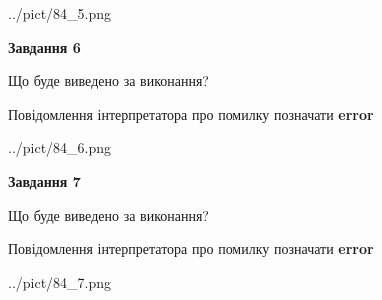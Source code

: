 \documentclass[10pt, ukrainian]{article}
\begin{document}
{\begin {large}
\begin{center}
	{../pict/84_5.png}
\end{center}
\newpage

{\begin {center}\textbf{Завдання 6}\end {center}}\par
Що буде виведено за виконання? \par
Повідомлення інтерпретатора про помилку позначати \textbf{error}

\begin{center}
	{../pict/84_6.png}
\end{center}
\newpage

{\begin {center}\textbf{Завдання 7}\end {center}}\par
Що буде виведено за виконання? \par
Повідомлення інтерпретатора про помилку позначати \textbf{error}

\begin{center}
	{../pict/84_7.png}
\end{center}
\newpage

\end {large}}
\end{document}
